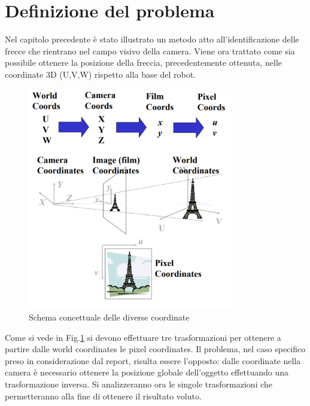 \section{Definizione del problema}
Nel capitolo precedente è stato illustrato un metodo atto all'identificazione delle frecce che rientrano nel campo visivo della camera. Viene ora trattato come sia possibile ottenere la posizione della freccia, precedentemente ottenuta, nelle coordinate 3D (U,V,W) rispetto alla base del robot.

\begin{figure}[H]
	\centering
	\includegraphics[width=0.8\textwidth]{Immagini/world_coords.png}
	\caption{Schema concettuale delle diverse coordinate}
	\label{fig:fromcamtoworld}
\end{figure}

Come si vede in Fig.\ref{fig:fromcamtoworld} si devono effettuare tre trasformazioni per ottenere a partire dalle world coordinates le pixel coordinates.
Il problema, nel caso specifico preso in considerazione dal report, risulta essere l'opposto: dalle coordinate nella camera è necessario ottenere la posizione globale dell'oggetto effettuando una trasformazione inversa.
Si analizzeranno ora le singole trasformazioni che permetteranno alla fine di ottenere il risultato voluto.


